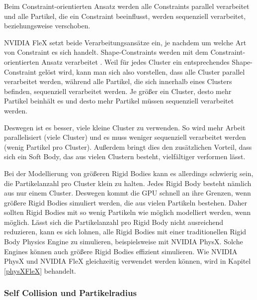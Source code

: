 Beim Constraint-orientierten Ansatz werden alle Constraints parallel verarbeitet und alle Partikel, die ein Constraint beeinflusst, werden sequenziell verarbeitet, beziehungsweise verschoben. 

NVIDIA FleX setzt beide Verarbeitungsansätze ein, je nachdem um welche Art von Constraint es sich handelt. Shape-Constraints werden mit dem Constraint-orientierten Ansatz verarbeitet \cite{FlexD3D}. Weil für jedes Cluster ein entsprechendes Shape-Constraint gelöst wird, kann man sich also vorstellen, dass alle Cluster parallel verarbeitet werden, während alle Partikel, die sich innerhalb eines Clusters befinden, sequenziell verarbeitet werden. Je größer ein Cluster, desto mehr Partikel beinhält es und desto mehr Partikel müssen sequenziell verarbeitet werden. 

Deswegen ist es besser, viele kleine Cluster zu verwenden. So wird mehr Arbeit parallelisiert (viele Cluster) und es muss weniger sequenziell verarbeitet werden (wenig Partikel pro Cluster). Außerdem bringt dies den zusätzlichen Vorteil, dass sich ein Soft Body, das aus vielen Clustern besteht, vielfältiger verformen lässt.

Bei der Modellierung von größeren Rigid Bodies kann es allerdings schwierig sein, die Partikelanzahl pro Cluster klein zu halten. Jedes Rigid Body besteht nämlich aus nur einem Cluster. Deswegen kommt die GPU schnell an ihre Grenzen, wenn größere Rigid Bodies simuliert werden, die aus vielen Partikeln bestehen. Daher sollten Rigid Bodies mit so wenig Partikeln wie möglich modelliert werden, wenn möglich. %
Lässt sich die Partikelanzahl pro Rigid Body nicht ausreichend reduzieren, kann es sich lohnen, alle Rigid Bodies mit einer traditionellen Rigid Body Physics Engine zu simulieren, beispielsweise mit NVIDIA PhysX. Solche Engines können auch größere Rigid Bodies effizient simulieren. Wie NVIDIA PhysX und NVIDIA FleX gleichzeitig verwendet werden können, wird in Kapitel \ref{physXFleX} behandelt.

\subsubsection{Self Collision und Partikelradius}


